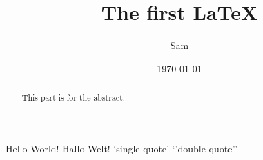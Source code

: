 \documentclass{article}
\title{The first LaTeX}
\date{\today}
\author{Sam}
\begin{document}
  \maketitle
  \begin{abstract}
	This part is for the abstract.
  \end{abstract}
  \newpage
	Hello World!
  \newpage
	Hallo Welt!
  \newpage
	`single quote'
	`'double quote''
\end{document}
